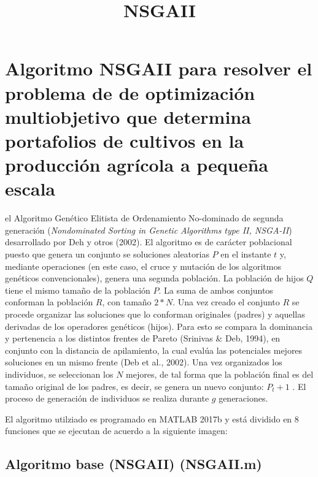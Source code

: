 \documentclass[11pt]{article}
\title{NSGAII}
\begin{document}
    
    
    \maketitle
    
    

    
    \hypertarget{algoritmo-nsgaii-para-resolver-el-problema-de-de-optimizaciuxf3n-multiobjetivo-que-determina-portafolios-de-cultivos-en-la-producciuxf3n-agruxedcola-a-pequeuxf1a-escala}{%
\section{Algoritmo NSGAII para resolver el problema de de optimización
multiobjetivo que determina portafolios de cultivos en la producción
agrícola a pequeña
escala}\label{algoritmo-nsgaii-para-resolver-el-problema-de-de-optimizaciuxf3n-multiobjetivo-que-determina-portafolios-de-cultivos-en-la-producciuxf3n-agruxedcola-a-pequeuxf1a-escala}}

el Algoritmo Genético Elitista de Ordenamiento No-dominado de segunda
generación (\emph{Nondominated Sorting in Genetic Algorithms type II,
NSGA-II}) desarrollado por Deh y otros (2002). El algoritmo es de
carácter poblacional puesto que genera un conjunto se soluciones
aleatorias \(P\) en el instante \(t\) y, mediante operaciones (en este
caso, el cruce y mutación de los algoritmos genéticos convencionales),
genera una segunda población. La población de hijos \(Q\) tiene el mismo
tamaño de la población \(P\). La suma de ambos conjuntos conforman la
población \(R\), con tamaño \(2*N\). Una vez creado el conjunto \(R\) se
procede organizar las soluciones que lo conforman originales (padres) y
aquellas derivadas de los operadores genéticos (hijos). Para esto se
compara la dominancia y pertenencia a los distintos frentes de Pareto
(Srinivas \& Deb, 1994), en conjunto con la distancia de apilamiento, la
cual evalúa las potenciales mejores soluciones en un mismo frente (Deb
et al., 2002). Una vez organizados los individuos, se seleccionan los
\(N\) mejores, de tal forma que la población final es del tamaño
original de los padres, es decir, se genera un nuevo conjunto: \(P_t+1\)
. El proceso de generación de individuos se realiza durante \(g\)
generaciones.

El algoritmo utilziado es programado en MATLAB 2017b y está dividido en
8 funciones que se ejecutan de acuerdo a la siguiente imagen:

    \hypertarget{algoritmo-base-nsgaii-nsgaii.m}{%
\subsection{Algoritmo base (NSGAII)
(NSGAII.m)}\label{algoritmo-base-nsgaii-nsgaii.m}}
\end{document}
